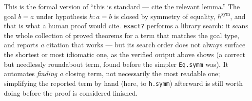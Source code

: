 \begin{mathreading}

This is the formal version of ``this is standard --- cite the relevant lemma.'' The goal \(b = a\) under hypothesis \(h : a = b\) is closed by symmetry of equality, \(h^{\mathrm{sym}}\), and that is what a human proof would cite. \texttt{exact?} performs a library search: it scans the whole collection of proved theorems for a term that matches the goal type, and reports \emph{a} citation that works --- but its search order does not always surface the shortest or most idiomatic one, as the verified output above shows (a correct but needlessly roundabout term, found before the simpler \texttt{Eq.symm} was). It automates \emph{finding a} closing term, not necessarily the most readable one; simplifying the reported term by hand (here, to \texttt{h.symm}) afterward is still worth doing before the proof is considered finished.

\end{mathreading}
